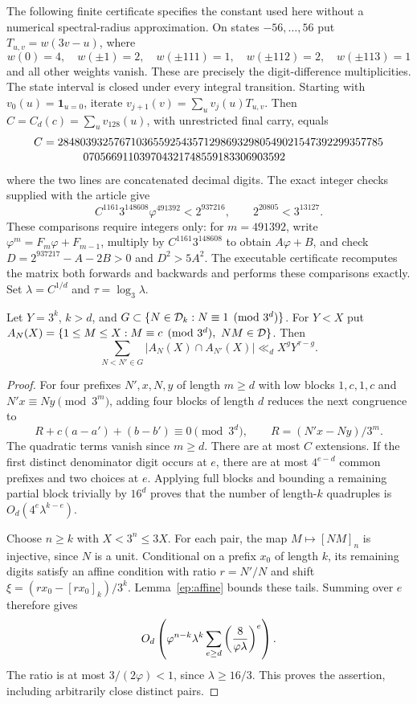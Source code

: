 The following finite certificate specifies the constant used here
without a numerical spectral-radius approximation. On states
$-56,\ldots,56$ put $T_{u,v}=w(3v-u)$, where
\[
 w(0)=4,\quad w(\pm1)=2,\quad w(\pm111)=1,\quad
 w(\pm112)=2,\quad w(\pm113)=1
\]
and all other weights vanish. These are precisely the digit-difference
multiplicities. The state interval is closed under every integral
transition. Starting with $v_0(u)=\mathbf1_{u=0}$, iterate
$v_{j+1}(v)=\sum_u v_j(u)T_{u,v}$. Then
$C=C_d(c)=\sum_u v_{128}(u)$, with unrestricted final carry, equals
\[
\begin{split}
 C={}&2848039325767103655925435712986932980549021547392299357785\\[-2pt]
     &\hspace{8mm}070566911039704321748559183306903592
\end{split}
\]
where the two lines are concatenated decimal digits.
The exact integer checks supplied with the article give
\begin{equation}\label{ep:cert}
 C^{1161}3^{148608}\varphi^{491392}<2^{937216},\qquad
 2^{20805}<3^{13127}.
\end{equation}
These comparisons require integers only: for $m=491392$, write
$\varphi^m=F_m\varphi+F_{m-1}$, multiply by
$C^{1161}3^{148608}$ to obtain $A\varphi+B$, and check
$D=2^{937217}-A-2B>0$ and $D^2>5A^2$.
The executable certificate recomputes the matrix both forwards and
backwards and performs these comparisons exactly.
Set $\lambda=C^{1/d}$ and $\tau=\log_3\lambda$.

\begin{lemma}\label{ep:pairs}
Let $Y=3^k$, $k>d$, and $G\subset\{N\in\mathcal D_k:N\equiv1\pmod{3^d}\}$.
For $Y<X$ put
$A_N(X)=\{1\le M\le X:M\equiv c\pmod{3^d},\ NM\in\mathcal D\}$.
Then
\[
 \sum_{N<N'\in G}|A_N(X)\cap A_{N'}(X)|\ll_d X^gY^{\tau-g}.
\]
\end{lemma}
\begin{proof}
For four prefixes $N',x,N,y$ of length $m\ge d$ with low blocks
$1,c,1,c$ and $N'x\equiv Ny\pmod{3^m}$, adding four blocks of
length $d$ reduces the next congruence to
\[
 R+c(a-a')+(b-b')\equiv0\pmod{3^d},\qquad R=(N'x-Ny)/3^m.
\]
The quadratic terms vanish since $m\ge d$. There are at most $C$
extensions. If the first distinct denominator digit occurs at $e$,
there are at most $4^{e-d}$ common prefixes and two choices at $e$.
Applying full blocks and bounding a remaining partial block trivially
by $16^d$ proves that the number of length-$k$ quadruples is
$O_d(4^e\lambda^{k-e})$.

Choose $n\ge k$ with $X<3^n\le3X$. For each pair, the map
$M\mapsto[NM]_n$ is injective, since $N$ is a unit. Conditional on a
prefix $x_0$ of length $k$, its remaining digits satisfy an affine
condition with ratio $r=N'/N$ and shift
$\xi=(rx_0-[rx_0]_k)/3^k$. Lemma~\ref{ep:affine} bounds these tails.
Summing over $e$ therefore gives
\[
 O_d\left(\varphi^{n-k}\lambda^k
       \sum_{e\ge d}\left({8\over\varphi\lambda}\right)^e\right).
\]
The ratio is at most $3/(2\varphi)<1$, since $\lambda\ge16/3$.
This proves the assertion, including arbitrarily close distinct pairs.
\end{proof}

